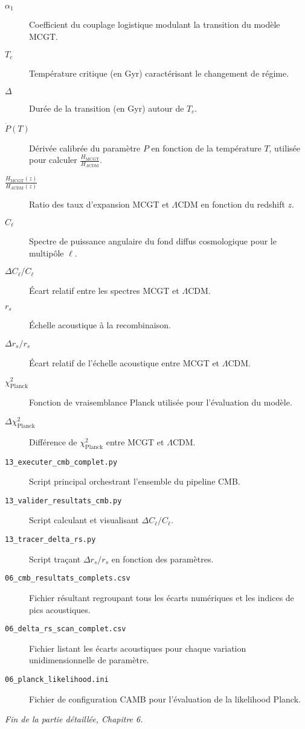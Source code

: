 \begin{description}
  \item[\(\alpha_{1}\)] Coefficient du couplage logistique modulant la transition du modèle MCGT.
  \item[\(T_{c}\)] Température critique (en Gyr) caractérisant le changement de régime.
  \item[\(\Delta\)] Durée de la transition (en Gyr) autour de \(T_{c}\).
  \item[\(\dot P(T)\)] Dérivée calibrée du paramètre \(P\) en fonction de la température \(T\), utilisée pour calculer \(\frac{H_{\mathrm{MCGT}}}{H_{\Lambda\mathrm{CDM}}}\).
  \item[\(\tfrac{H_{\mathrm{MCGT}}(z)}{H_{\Lambda\mathrm{CDM}}(z)}\)] Ratio des taux d’expansion MCGT et \(\Lambda\)CDM en fonction du redshift \(z\).
  \item[\(C_{\ell}\)] Spectre de puissance angulaire du fond diffus cosmologique pour le multipôle \(\ell\).
  \item[\(\Delta C_{\ell}/C_{\ell}\)] Écart relatif entre les spectres MCGT et \(\Lambda\)CDM.
  \item[\(r_{s}\)] Échelle acoustique à la recombinaison.
  \item[\(\Delta r_{s}/r_{s}\)] Écart relatif de l’échelle acoustique entre MCGT et \(\Lambda\)CDM.
  \item[\(\chi^{2}_{\mathrm{Planck}}\)] Fonction de vraisemblance Planck utilisée pour l’évaluation du modèle.
  \item[\(\Delta\chi^{2}_{\mathrm{Planck}}\)] Différence de \(\chi^{2}_{\mathrm{Planck}}\) entre MCGT et \(\Lambda\)CDM.
  \item[\texttt{13\_executer\_cmb\_complet.py}] Script principal orchestrant l’ensemble du pipeline CMB.
  \item[\texttt{13\_valider\_resultats\_cmb.py}] Script calculant et visualisant \(\Delta C_{\ell}/C_{\ell}\).
  \item[\texttt{13\_tracer\_delta\_rs.py}] Script traçant \(\Delta r_{s}/r_{s}\) en fonction des paramètres.
  \item[\texttt{06\_cmb\_resultats\_complets.csv}] Fichier résultant regroupant tous les écarts numériques et les indices de pics acoustiques.
  \item[\texttt{06\_delta\_rs\_scan\_complet.csv}] Fichier listant les écarts acoustiques pour chaque variation unidimensionnelle de paramètre.
  \item[\texttt{06\_planck\_likelihood.ini}] Fichier de configuration CAMB pour l’évaluation de la likelihood Planck.
\end{description}

\bigskip
\noindent\emph{Fin de la partie détaillée, Chapitre 6.}